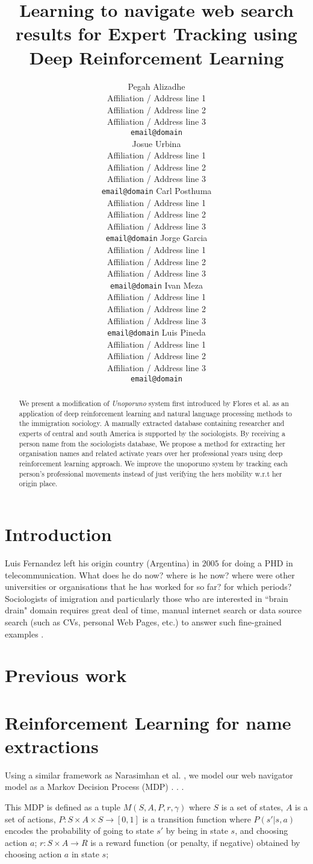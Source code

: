 \documentclass[11pt,a4paper]{article}
\title{Learning to navigate web search results for Expert Tracking using Deep Reinforcement Learning}
\author{Pegah Alizadhe \\
  Affiliation / Address line 1 \\
  Affiliation / Address line 2 \\
  Affiliation / Address line 3 \\
  {\tt email@domain} \\\And
  Josue Urbina \\
  Affiliation / Address line 1 \\
  Affiliation / Address line 2 \\
  Affiliation / Address line 3 \\
  {\tt email@domain}
  Carl Posthuma \\
  Affiliation / Address line 1 \\
  Affiliation / Address line 2 \\
  Affiliation / Address line 3 \\
  {\tt email@domain} 
  Jorge Garcia \\
  Affiliation / Address line 1 \\
  Affiliation / Address line 2 \\
  Affiliation / Address line 3 \\
  {\tt email@domain} 
  Ivan Meza \\
  Affiliation / Address line 1 \\
  Affiliation / Address line 2 \\
  Affiliation / Address line 3 \\
  {\tt email@domain} 
  Luis Pineda \\
  Affiliation / Address line 1 \\
  Affiliation / Address line 2 \\
  Affiliation / Address line 3 \\
  {\tt email@domain}
  \\}
\date{}
\begin{document}
\maketitle
\begin{abstract}
We present a modification of \textit{Unoporuno} system first introduced by Flores et al. \citep{Flores2012} as an application of deep reinforcement learning and natural language processing methods to the immigration sociology. A manually extracted database containing researcher and experts of central and south America is supported by the sociologists. By receiving a person name from the sociologists database, We propose a method for extracting her organisation names and related activate years over her professional years using deep reinforcement learning approach. We improve the unoporuno system by tracking each person's professional movements instead of just verifying the hers mobility w.r.t her origin place. 
\end{abstract}

\section{Introduction}
Luis Fernandez left his origin country (Argentina) in  $2005$ for doing a PHD in telecommunication. What does he do now? where is he now? where were other universities or organisations that he has worked for so far? for which periods? Sociologists of imigration and particularly those who are interested in ``brain drain" domain requires great deal of time, manual internet search or data source search (such as CVs, personal Web Pages, etc.) to answer such fine-grained examples \cite{Auriol2010,Meyer2006}. 


\section{Previous work}

\section{Reinforcement Learning for name extractions}
Using a similar framework as Narasimhan et al. , we model our web navigator model as a Markov Decision Process (MDP) \cite{puterman1994}. . .

This MDP is defined as a tuple $M(S, A, P, r, \gamma)$ where $S$ is a set of states, $A$ is a set of actions, $P :S\times A  \times S  \longrightarrow [0,1]$ is a transition function where $P(s′|s,a)$ encodes the probability of going to state $s'$ by being in state $s$, and choosing action $a$; $r : S \times A \longrightarrow R$ is a reward function (or penalty, if negative) obtained by choosing action $a$ in state $s$; 
\end{document}
